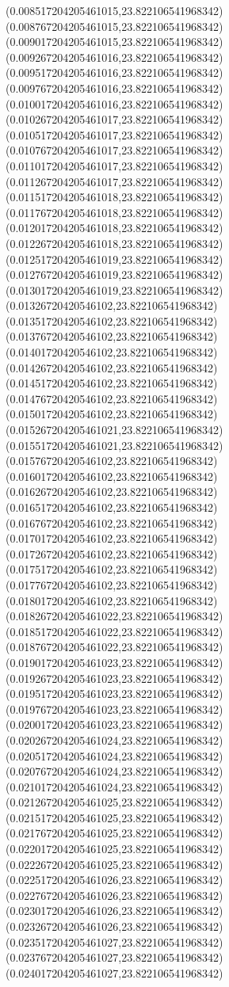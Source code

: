 {(0.008517204205461015,23.822106541968342)
(0.008767204205461015,23.822106541968342)
(0.009017204205461015,23.822106541968342)
(0.009267204205461016,23.822106541968342)
(0.009517204205461016,23.822106541968342)
(0.009767204205461016,23.822106541968342)
(0.010017204205461016,23.822106541968342)
(0.010267204205461017,23.822106541968342)
(0.010517204205461017,23.822106541968342)
(0.010767204205461017,23.822106541968342)
(0.011017204205461017,23.822106541968342)
(0.011267204205461017,23.822106541968342)
(0.011517204205461018,23.822106541968342)
(0.011767204205461018,23.822106541968342)
(0.012017204205461018,23.822106541968342)
(0.012267204205461018,23.822106541968342)
(0.012517204205461019,23.822106541968342)
(0.012767204205461019,23.822106541968342)
(0.013017204205461019,23.822106541968342)
(0.01326720420546102,23.822106541968342)
(0.01351720420546102,23.822106541968342)
(0.01376720420546102,23.822106541968342)
(0.01401720420546102,23.822106541968342)
(0.01426720420546102,23.822106541968342)
(0.01451720420546102,23.822106541968342)
(0.01476720420546102,23.822106541968342)
(0.01501720420546102,23.822106541968342)
(0.015267204205461021,23.822106541968342)
(0.015517204205461021,23.822106541968342)
(0.01576720420546102,23.822106541968342)
(0.01601720420546102,23.822106541968342)
(0.01626720420546102,23.822106541968342)
(0.01651720420546102,23.822106541968342)
(0.01676720420546102,23.822106541968342)
(0.01701720420546102,23.822106541968342)
(0.01726720420546102,23.822106541968342)
(0.01751720420546102,23.822106541968342)
(0.01776720420546102,23.822106541968342)
(0.01801720420546102,23.822106541968342)
(0.018267204205461022,23.822106541968342)
(0.018517204205461022,23.822106541968342)
(0.018767204205461022,23.822106541968342)
(0.019017204205461023,23.822106541968342)
(0.019267204205461023,23.822106541968342)
(0.019517204205461023,23.822106541968342)
(0.019767204205461023,23.822106541968342)
(0.020017204205461023,23.822106541968342)
(0.020267204205461024,23.822106541968342)
(0.020517204205461024,23.822106541968342)
(0.020767204205461024,23.822106541968342)
(0.021017204205461024,23.822106541968342)
(0.021267204205461025,23.822106541968342)
(0.021517204205461025,23.822106541968342)
(0.021767204205461025,23.822106541968342)
(0.022017204205461025,23.822106541968342)
(0.022267204205461025,23.822106541968342)
(0.022517204205461026,23.822106541968342)
(0.022767204205461026,23.822106541968342)
(0.023017204205461026,23.822106541968342)
(0.023267204205461026,23.822106541968342)
(0.023517204205461027,23.822106541968342)
(0.023767204205461027,23.822106541968342)
(0.024017204205461027,23.822106541968342)
}

